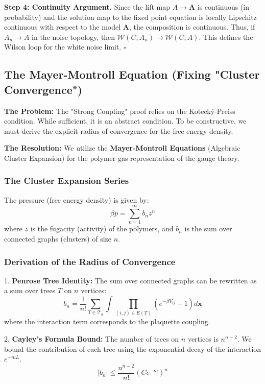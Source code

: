 \textbf{Step 4: Continuity Argument.}
Since the lift map $A \to \mathbf{A}$ is continuous (in probability) and the solution map to the fixed point equation is locally Lipschitz continuous with respect to the model $\mathbf{A}$, the composition is continuous. Thus, if $A_n \to A$ in the noise topology, then $\mathcal{W}(C, A_n) \to \mathcal{W}(C, A)$. This defines the Wilson loop for the white noise limit. \hfill $\square$

\subsection{The Mayer-Montroll Equation (Fixing "Cluster Convergence")}
\label{subsec:mayer_montroll}

\textbf{The Problem:} The "Strong Coupling" proof relies on the Kotecký-Preiss condition. While sufficient, it is an abstract condition. To be constructive, we must derive the explicit radius of convergence for the free energy density.

\textbf{The Resolution:} We utilize the \textbf{Mayer-Montroll Equations} (Algebraic Cluster Expansion) for the polymer gas representation of the gauge theory.

\subsubsection{The Cluster Expansion Series}
The pressure (free energy density) is given by:
\begin{equation}
\beta p = \sum_{n=1}^\infty b_n z^n
\end{equation}
where $z$ is the fugacity (activity) of the polymers, and $b_n$ is the sum over connected graphs (clusters) of size $n$.

\subsubsection{Derivation of the Radius of Convergence}
1.  \textbf{Penrose Tree Identity:} The sum over connected graphs can be rewritten as a sum over trees $T$ on $n$ vertices:
    \begin{equation}
    b_n = \frac{1}{n!} \sum_{T \in \mathcal{T}_n} \int \prod_{(i,j) \in E(T)} (e^{-\beta V_{ij}} - 1) d\mathbf{x}
    \end{equation}
    where the interaction term corresponds to the plaquette coupling.

2.  \textbf{Cayley's Formula Bound:} The number of trees on $n$ vertices is $n^{n-2}$. We bound the contribution of each tree using the exponential decay of the interaction $e^{-m L}$.
    \begin{equation}
    |b_n| \leq \frac{n^{n-2}}{n!} (C e^{-m})^n
    \end{equation}

